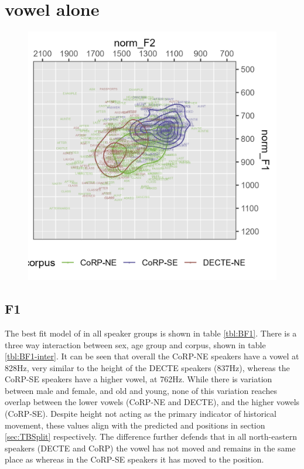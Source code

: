 \documentclass[../../00.FullDoc/tex/Thesis]{subfiles}
\begin{document}
\section{ vowel alone} \label{sec:bath}

\begin{figure}[h]
	\includegraphics[width=\textwidth]{../figures/B-vplot.png}
	\caption{\bath{}} \label{fig:Bvplot}
\end{figure}



\subsection{F1}
The best fit model of \bath{} in all speaker groups is shown in table \ref{tbl:BF1}. There is a three way interaction between sex, age group and corpus, shown in table \ref{tbl:BF1-inter}. It can be seen that overall the CoRP-NE speakers have a \bath{} vowel at 828Hz, very similar to the height of the DECTE speakers (837Hz), whereas the CoRP-SE speakers have a higher vowel, at 762Hz. While there is variation between male and female, and old and young, none of this variation reaches overlap between the lower vowels (CoRP-NE and DECTE), and the higher vowels (CoRP-SE). Despite height not acting as the primary indicator of historical \bath{} movement, these values align with the predicted \trap{} and \palm{} positions in section \ref{sec:TBSplit} respectively. The difference further defends that in all north-eastern speakers (DECTE and CoRP) the \bath{} vowel has not moved and remains in the same place as \trap{} whereas in the CoRP-SE speakers it has moved to the \palm{} position.
\end{document}
